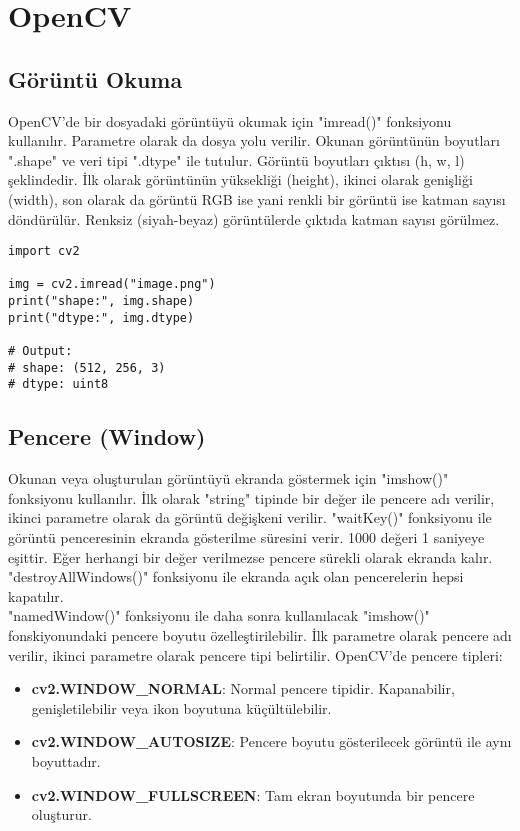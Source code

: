 \section{OpenCV}

\subsection{Görüntü Okuma}
OpenCV'de bir dosyadaki görüntüyü okumak için "imread()" fonksiyonu kullanılır. Parametre olarak da dosya yolu verilir. Okunan görüntünün boyutları ".shape" ve veri tipi ".dtype" ile tutulur. Görüntü boyutları çıktısı (h, w, l) şeklindedir. İlk olarak görüntünün yüksekliği (height), ikinci olarak genişliği (width), son olarak da görüntü RGB ise yani renkli bir görüntü ise katman sayısı döndürülür. Renksiz (siyah-beyaz) görüntülerde çıktıda katman sayısı görülmez.

\begin{lstlisting}
import cv2

img = cv2.imread("image.png")
print("shape:", img.shape)
print("dtype:", img.dtype)

# Output:
# shape: (512, 256, 3)
# dtype: uint8
\end{lstlisting}

\subsection{Pencere (Window)}
Okunan veya oluşturulan görüntüyü ekranda göstermek için "imshow()" fonksiyonu kullanılır. İlk olarak "string" tipinde bir değer ile pencere adı verilir, ikinci parametre olarak da görüntü değişkeni verilir. "waitKey()" fonksiyonu ile görüntü penceresinin ekranda gösterilme süresini verir. 1000 değeri 1 saniyeye eşittir. Eğer herhangi bir değer verilmezse pencere sürekli olarak ekranda kalır. "destroyAllWindows()" fonksiyonu ile ekranda açık olan pencerelerin hepsi kapatılır.\\
"namedWindow()" fonksiyonu ile daha sonra kullanılacak "imshow()" fonskiyonundaki pencere boyutu özelleştirilebilir. İlk parametre olarak pencere adı verilir, ikinci parametre olarak pencere tipi belirtilir. OpenCV'de pencere tipleri:
\begin{itemize}
	\item \textbf{cv2.WINDOW\_NORMAL}: Normal pencere tipidir. Kapanabilir, genişletilebilir veya ikon boyutuna küçültülebilir.
	\item \textbf{cv2.WINDOW\_AUTOSIZE}: Pencere boyutu gösterilecek görüntü ile aynı boyuttadır. 
	\item \textbf{cv2.WINDOW\_FULLSCREEN}: Tam ekran boyutunda bir pencere oluşturur.
\end{itemize}

